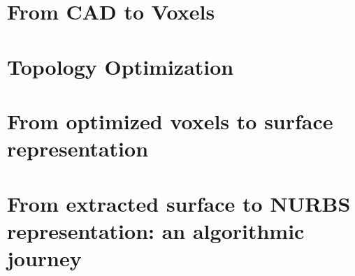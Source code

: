%
\section{From CAD to Voxels}
\label{sec: CADToVoxels}



\section{Topology Optimization}


\section{From optimized voxels to surface representation}


\section{From extracted surface to NURBS representation: an algorithmic journey}




